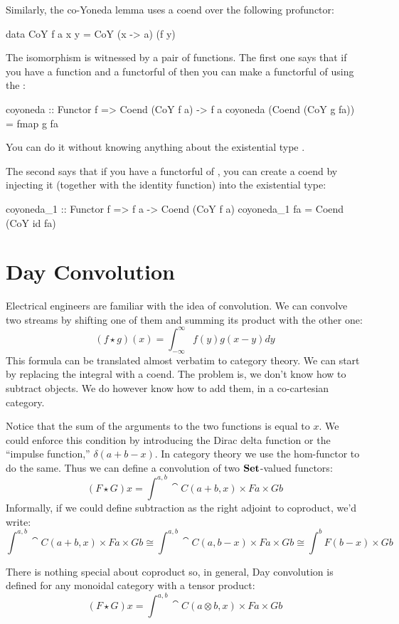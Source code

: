 \documentclass[DaoFP]{subfiles}
\begin{document}
Similarly, the co-Yoneda lemma uses a coend over the following profunctor:
\begin{haskell}
data CoY f a x y = CoY (x -> a) (f y)
\end{haskell}
The isomorphism is witnessed by a pair of functions. The first one says that if you have a function  and a functorful of  then you can make a functorful of  using the :
\begin{haskell}
coyoneda :: Functor f => Coend (CoY f a) -> f a
coyoneda (Coend (CoY g fa)) = fmap g fa
\end{haskell}
You can do it without knowing anything about the existential type .

The second says that if you have a functorful of , you can create a coend by injecting it (together with the identity function) into the existential type:
\begin{haskell}
coyoneda_1 :: Functor f => f a -> Coend (CoY f a)
coyoneda_1 fa = Coend (CoY id fa)
\end{haskell}

\section{Day Convolution}

Electrical engineers are familiar with the idea of convolution. We can convolve two streams by shifting one of them and summing its product with the other one: 
\[ (f \star g)(x) = \int^{\infty}_{-\infty} f(y) g(x - y) dy \]
This formula can be translated almost verbatim to category theory. We can start by replacing the integral with a coend. The problem is, we don't know how to subtract objects. We do however know how to add them, in a co-cartesian category. 

Notice that the sum of the arguments to the two functions is equal to $x$. We could enforce this condition by introducing the Dirac delta function or the ``impulse function,'' $\delta(a + b - x)$. In category theory we use the hom-functor to do the same. Thus we can define a convolution of two $\mathbf{Set}$-valued functors:
\[ (F \star G) x = \int^{a, b} \cat C (a + b, x) \times F a \times G b \]
Informally, if we could define subtraction as the right adjoint to coproduct, we'd write:
\[ \int^{a, b} \cat C (a + b, x) \times F a \times G b \cong \int^{a, b} \cat C (a, b - x) \times F a \times G b \cong \int^b F (b - x) \times G b\]

There is nothing special about coproduct so, in general, Day convolution is defined for any monoidal category with a tensor product:
\[ (F \star G) x = \int^{a, b} \cat C (a \otimes b, x) \times F a \times G b \]
\end{document}
